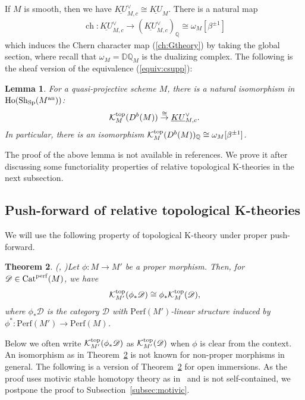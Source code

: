 \documentclass [11pt,oneside,a4paper,mathscr]{amsart}
\newtheorem{thm}{Theorem}[section]
\newtheorem{lemma}[thm]{Lemma}
\theoremstyle{definition}
\newcommand{\ch}{\operatorname{ch}}
\begin{document}
If $M$ is smooth, then 
we have $\underline{KU}_{M, c}^{\vee} \cong \underline{KU}_M$. There is a natural map
\begin{align*}
    \ch \colon \underline{KU}_{M, c}^{\vee} \to 
    (\underline{KU}_{M, c}^{\vee})_{\mathbb{Q}} \cong 
    \omega_M[\beta^{\pm 1}]
\end{align*}
which induces the Chern character map (\ref{ch:Gtheory})
by taking the global section, 
where recall that $\omega_M=\mathbb{D} \mathbb{Q}_M$ is the dualizing 
complex. 
The following is the sheaf version of the equivalence (\ref{equiv:csupp}):
\begin{lemma}\label{lem:KBM}
	For a quasi-projective scheme $M$, 
	there is a natural isomorphism in $\mathrm{Ho}(\mathrm{Sh}_{\mathrm{Sp}}(M^{\rm{an}}))$:
	\begin{align}\label{equiv:singular}
		\mathcal{K}_M^{\rm{top}}(D^b(M)) \stackrel{\cong}{\to} \underline{KU}_{M, c}^{\vee}. 
	\end{align}
	In particular, there is an isomorphism 
			$\mathcal{K}_M^{\rm{top}}(D^b(M))_{\mathbb{Q}} \cong \omega_M[\beta^{\pm 1}]$. 
		\end{lemma}
The proof of the above lemma is not
available in references. 
We prove it after discussing some 
functoriality properties of relative 
topological K-theories in the next subsection. 

\subsection{Push-forward of relative topological K-theories}
We will use the following property of 
topological K-theory under proper push-forward. 

\begin{thm}\emph{(\cite[Proposition~7.8]{Moulinos}, \cite[Theorem~2.12]{GS})}\label{thm:phiproper}
	Let $\phi \colon M \to M'$ be a proper morphism.
	Then, for $\mathscr{D} \in \mathrm{Cat}^{\rm{perf}}(M)$, we have 
	\begin{align*}
		\mathcal{K}_{M'}^{\rm{top}}(\phi_{\ast}\mathscr{D}) \cong \phi_{\ast}\mathcal{K}_M^{\rm{top}}(\mathscr{D}), 
	\end{align*}
	where $\phi_{\ast}\mathscr{D}$ is the category $\mathscr{D}$
	with $\mathrm{Perf}(M')$-linear structure induced by 
	$\phi^{\ast} \colon \mathrm{Perf}(M') \to \mathrm{Perf}(M)$. 
\end{thm}
Below we often write $\mathcal{K}_{M'}^{\rm{top}}(\phi_{\ast}\mathscr{D})$ as 
$\mathcal{K}_{M'}^{\rm{top}}(\mathscr{D})$ when $\phi$ is clear from the context. 
An isomorphism as in Theorem~\ref{thm:phiproper} is not known for 
non-proper morphisms in general. 
The following is a version of Theorem~\ref{thm:phiproper}
for open immersions. 
As the proof uses motivic stable homotopy theory as in~\cite[Proposition~7.7]{Moulinos} and is not self-contained, 
we postpone the proof to Subsection~\ref{subsec:motivic}. 
\end{document}

